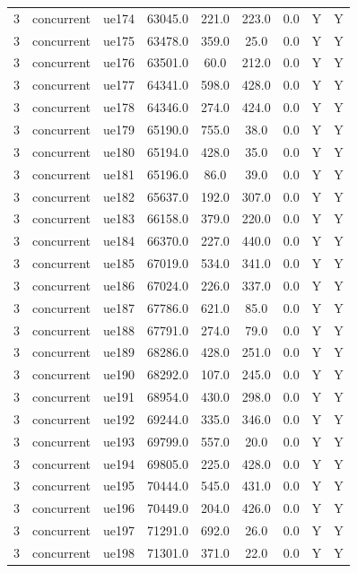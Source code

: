 \begin{table}[ht]
\begin{tabular}{|c|c|c|c|c|c|c|c|c|}
3 & concurrent & ue174 & 63045.0 & 221.0 & 223.0 & 0.0 & Y & Y \\
3 & concurrent & ue175 & 63478.0 & 359.0 & 25.0 & 0.0 & Y & Y \\
3 & concurrent & ue176 & 63501.0 & 60.0 & 212.0 & 0.0 & Y & Y \\
3 & concurrent & ue177 & 64341.0 & 598.0 & 428.0 & 0.0 & Y & Y \\
3 & concurrent & ue178 & 64346.0 & 274.0 & 424.0 & 0.0 & Y & Y \\
3 & concurrent & ue179 & 65190.0 & 755.0 & 38.0 & 0.0 & Y & Y \\
3 & concurrent & ue180 & 65194.0 & 428.0 & 35.0 & 0.0 & Y & Y \\
3 & concurrent & ue181 & 65196.0 & 86.0 & 39.0 & 0.0 & Y & Y \\
3 & concurrent & ue182 & 65637.0 & 192.0 & 307.0 & 0.0 & Y & Y \\
3 & concurrent & ue183 & 66158.0 & 379.0 & 220.0 & 0.0 & Y & Y \\
3 & concurrent & ue184 & 66370.0 & 227.0 & 440.0 & 0.0 & Y & Y \\
3 & concurrent & ue185 & 67019.0 & 534.0 & 341.0 & 0.0 & Y & Y \\
3 & concurrent & ue186 & 67024.0 & 226.0 & 337.0 & 0.0 & Y & Y \\
3 & concurrent & ue187 & 67786.0 & 621.0 & 85.0 & 0.0 & Y & Y \\
3 & concurrent & ue188 & 67791.0 & 274.0 & 79.0 & 0.0 & Y & Y \\
3 & concurrent & ue189 & 68286.0 & 428.0 & 251.0 & 0.0 & Y & Y \\
3 & concurrent & ue190 & 68292.0 & 107.0 & 245.0 & 0.0 & Y & Y \\
3 & concurrent & ue191 & 68954.0 & 430.0 & 298.0 & 0.0 & Y & Y \\
3 & concurrent & ue192 & 69244.0 & 335.0 & 346.0 & 0.0 & Y & Y \\
3 & concurrent & ue193 & 69799.0 & 557.0 & 20.0 & 0.0 & Y & Y \\
3 & concurrent & ue194 & 69805.0 & 225.0 & 428.0 & 0.0 & Y & Y \\
3 & concurrent & ue195 & 70444.0 & 545.0 & 431.0 & 0.0 & Y & Y \\
3 & concurrent & ue196 & 70449.0 & 204.0 & 426.0 & 0.0 & Y & Y \\
3 & concurrent & ue197 & 71291.0 & 692.0 & 26.0 & 0.0 & Y & Y \\
3 & concurrent & ue198 & 71301.0 & 371.0 & 22.0 & 0.0 & Y & Y \\

\end{tabular}
\end{table}
